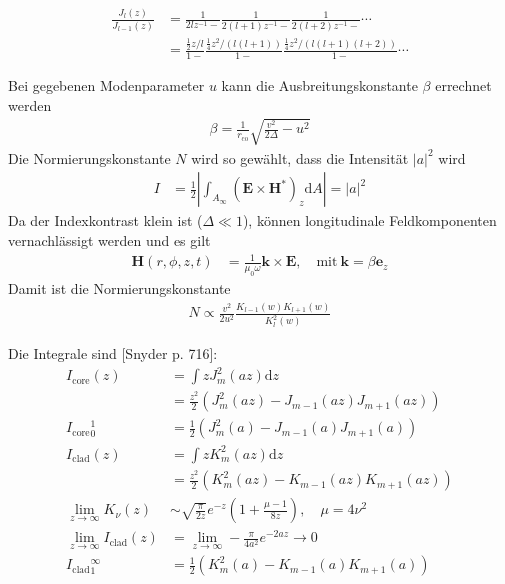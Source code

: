 \documentclass[DIV19,twocolumn]{scrartcl}
\newcommand{\vect}[1]{\mathbf{#1}}
\def\k{\vect k}
\def\e{\vect e}
\def\E{\vect E}
\def\H{\vect H}
\def\({\left(}
\def\){\right)}
\newcommand{\rco}{r_\textrm{co}}
\begin{document}
\begin{align}
  \frac{J_l(z)}{J_{l-1}(z)} &= \frac{1}{2lz^{-1}-} \frac{1}{2(l+1)z^{-1}-} \frac{1}{2(l+2)z^{-1} -}\cdots \\
  &= \frac{\frac{1}{2}z/l}{1-} \frac{\frac{1}{4}z^2/(l(l+1))}{1-} \frac{\frac{1}{4}z^2/(l(l+1)(l+2))}{1-} \cdots
\end{align}


Bei gegebenen Modenparameter $u$ kann die Ausbreitungskonstante
$\beta$ errechnet werden
\begin{align}
\beta = \frac{1}{\rco} \sqrt{\frac{v^2}{2\Delta} - u^2}
\end{align}
Die Normierungskonstante $N$ wird so gew\"ahlt, dass die Intensit\"at
$|a|^2$ wird
\begin{align}
  I &= \frac{1}{2}\left|\int_{A_\infty}\!\!\!\!\! \(\E\times\H^*\)_z  \textrm{d}A \right| = |a|^2
\end{align}
Da der Indexkontrast klein ist ($\Delta \ll 1$), k\"onnen longitudinale Feldkomponenten vernachl\"assigt werden und es gilt
\begin{align}
  \H(r,\phi,z,t) &= \frac{1}{\mu_0 \omega} \k \times \E, \quad\textrm{mit}\ \k = \beta \e_z
\end{align}
Damit ist die Normierungskonstante 
\begin{align}
  N \propto \frac{v^2}{2 u^2} \frac{K_{l-1}(w)K_{l+1}(w)}{K_l^2(w)}
\end{align}

Die Integrale sind [Snyder p. 716]: 
\begin{align}
  I_\textrm{core}(z) &= \int z J_m^2(az) \textrm{d} z \\&= \frac{z^2}{2}(J_m^2(az)-J_{m-1}(az)J_{m+1}(az))\\
  I_\textrm{core} {}^1_0 &= \frac{1}{2}(J_m^2(a)-J_{m-1}(a)J_{m+1}(a)) \\
  I_\textrm{clad}(z) &= \int z K_m^2(az) \textrm{d} z \\&= \frac{z^2}{2}(K_m^2(az)-K_{m-1}(az)K_{m+1}(az)) \\
  \lim_{z\rightarrow \infty} K_\nu(z) &\sim \sqrt{\frac{\pi}{2z}} e^{-z}\(1+\frac{\mu-1}{8z}\), \quad \mu=4\nu^2 \\ %
  \lim_{z\rightarrow \infty} I_\textrm{clad}(z)  & = \lim_{z\rightarrow \infty} -\frac{\pi}{4a^2}e^{-2az} \rightarrow 0 \\
  I_\textrm{clad} {}^\infty_1 &= \frac{1}{2}(K_m^2(a)-K_{m-1}(a)K_{m+1}(a)) 
\end{align}
\end{document}
